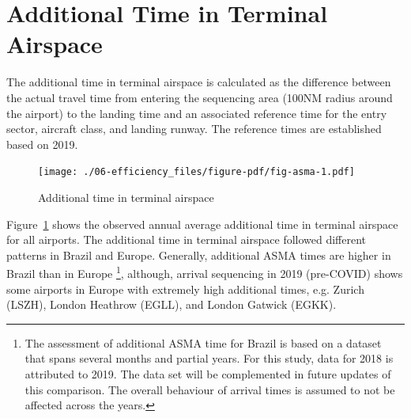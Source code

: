 \documentclass[
  a4paper,
  DIV=11,
  numbers=noendperiod]{scrreprt}
\begin{document}
\hypertarget{additional-time-in-terminal-airspace}{%
\section{Additional Time in Terminal
Airspace}\label{additional-time-in-terminal-airspace}}

The additional time in terminal airspace is calculated as the difference
between the actual travel time from entering the sequencing area (100NM
radius around the airport) to the landing time and an associated
reference time for the entry sector, aircraft class, and landing runway.
The reference times are established based on 2019.

\begin{figure}[h]

{\centering \texttt{[image: ./06-efficiency\_files/figure-pdf/fig-asma-1.pdf]}

}

\caption{\label{fig-asma}Additional time in terminal airspace}

\end{figure}

Figure~\ref{fig-asma} shows the observed annual average additional time
in terminal airspace for all airports. The additional time in terminal
airspace followed different patterns in Brazil and Europe. Generally,
additional ASMA times are higher in Brazil than in Europe \footnote{The
  assessment of additional ASMA time for Brazil is based on a dataset
  that spans several months and partial years. For this study, data for
  2018 is attributed to 2019. The data set will be complemented in
  future updates of this comparison. The overall behaviour of arrival
  times is assumed to not be affected across the years.}, although,
arrival sequencing in 2019 (pre-COVID) shows some airports in Europe
with extremely high additional times, e.g. Zurich (LSZH), London
Heathrow (EGLL), and London Gatwick (EGKK).
\end{document}
